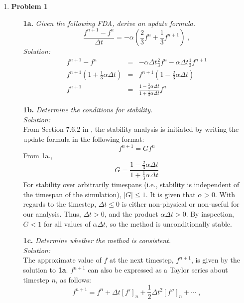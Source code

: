 \documentclass[12pt,letterpaper]{article}
\begin{document}
\pagebreak
\begin{enumerate}
\item \textbf{Problem 1}
\begin{itemize}
\item[\textbf{1a.}] \textit{Given the following FDA, derive an update formula.}
\label{update}
\begin{equation}
\frac{f^{n+1} - f^n}{\Delta t} = -\alpha\left(\frac{2}{3}f^n + \frac{1}{3}f^{n+1}	\right)\;,
\end{equation}
\textit{Solution:}\\
\begin{eqnarray*}
f^{n+1} - f^n &=& -\alpha \Delta t\frac{2}{3}f^n - \alpha \Delta t\frac{1}{3}f^{n+1}\\
f^{n+1}\left(1+\frac{1}{3}\alpha\Delta t \right) &=& f^{n+1}\left(1-\frac{2}{3}\alpha\Delta t \right)\\
f^{n+1} &=& \frac{1-\frac{2}{3}\alpha\Delta t}{1+\frac{1}{3}\alpha\Delta t}f^n
\end{eqnarray*}
\item[\textbf{1b.}] \textit{Determine the conditions for stability.}\\
\textit{Solution:}\\
From Section 7.6.2 in \cite{hoffman}, the stability analysis is initiated by writing the update formula in the following format:
\begin{equation}
f^{n+1} = Gf^n
\end{equation}
From 1a.,
\begin{equation}
G = \frac{1-\frac{2}{3}\alpha\Delta t}{1+\frac{1}{3}\alpha\Delta t}
\end{equation}
For stability over arbitrarily timespans (i.e., stability is independent of the timespan of the simulation), $|G|\leq 1$. It is given that $\alpha > 0$. With regards to the timestep, $\Delta t \leq 0$ is either non-physical or non-useful for our analysis. Thus, $\Delta t > 0$, and the product $\alpha \Delta t > 0$. By inspection, $G<1$ for all values of $\alpha \Delta t$, so the method is unconditionally stable.
\item[\textbf{1c.}] \textit{Determine whether the method is consistent.}\\
\textit{Solution:}\\
The approximate value of $f$ at the next timestep, $f^{n+1}$, is given by the solution to \textbf{1a}. $f^{n+1}$ can also be expressed as a Taylor series about timestep $n$, as follows:
\begin{equation}
f^{n+1} = f^n + \Delta t[f']_n + \frac{1}{2}\Delta t^2 [f'']_n + \cdots\;,

\end{equation}
\end{itemize}
\end{enumerate}
\end{document}
